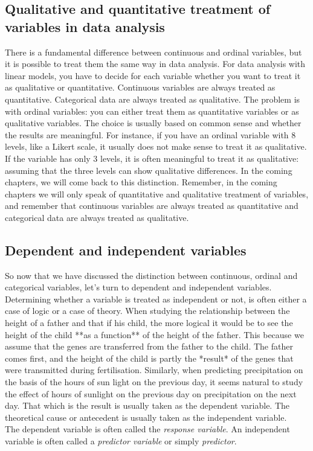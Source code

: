 \documentclass[]{report}\usepackage[]{graphicx}\usepackage[]{color}
\begin{document}
\subsection{Qualitative and quantitative treatment of variables in data analysis}
There is a fundamental difference between continuous and ordinal variables, but it is possible to treat them the same way in data analysis. For data analysis with linear models, you have to decide for each variable whether you want to treat it as qualitative or quantitative. Continuous variables are always treated as quantitative. Categorical data are always treated as qualitative. The problem is with ordinal variables: you can either treat them as quantitative variables or as qualitative variables. The choice is usually based on common sense and whether the results are meaningful. For instance, if you have an ordinal variable with 8 levels, like a Likert scale, it usually does not make sense to treat it as qualitative. If the variable has only 3 levels, it is often meaningful to treat it as qualitative: assuming that the three levels can show qualitative differences. In the coming chapters, we will come back to this distinction. Remember, in the coming chapters we will only speak of quantitative and qualitative treatment of variables, and remember that continuous variables are always treated as quantitative and categorical data are always treated as qualitative.


\subsection{Dependent and independent variables}
So now that we have discussed the distinction between continuous, ordinal and categorical variables, let's turn to dependent and independent variables. Determining whether a variable is treated as independent or not, is often either a case of logic or a case of theory. When studying the relationship between the height of a father and that if his child, the more logical it would be to see the height of the child **as a function** of the height of the father. This because we assume that the genes are transferred from the father to the child. The father comes first, and the height of the child is partly the *result* of the genes that were transmitted during fertilisation. Similarly, when predicting precipitation on the basis of the hours of sun light on the previous day, it seems natural to study the effect of hours of sunlight on the previous day on precipitation on the next day. That which is the result is usually taken as the dependent variable. The theoretical cause or antecedent is usually taken as the independent variable. \\
The dependent variable is often called the \textit{response variable}. An independent variable is often called a \textit{predictor variable} or simply \textit{predictor}.
\end{document}
